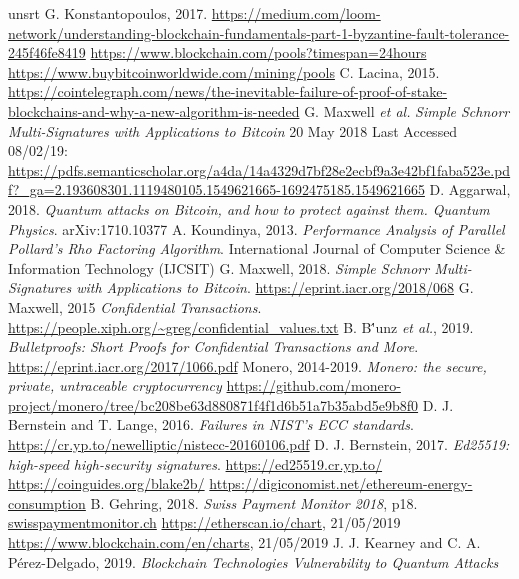 \documentclass[a4paper, 12pt]{book}
\begin{document}
\begin{thebibliography} {unsrt}
 G. Konstantopoulos, 2017. \url{https://medium.com/loom-network/understanding-blockchain-fundamentals-part-1-byzantine-fault-tolerance-245f46fe8419}
 \url{https://www.blockchain.com/pools?timespan=24hours} 
 \url{https://www.buybitcoinworldwide.com/mining/pools}
 C. Lacina, 2015. \url{https://cointelegraph.com/news/the-inevitable-failure-of-proof-of-stake-blockchains-and-why-a-new-algorithm-is-needed}
 G. Maxwell \textit{et al.} {\em Simple Schnorr Multi-Signatures with Applications to Bitcoin} 20 May 2018 Last Accessed 08/02/19: \url{https://pdfs.semanticscholar.org/a4da/14a4329d7bf28e2ecbf9a3e42bf1faba523e.pdf?_ga=2.193608301.1119480105.1549621665-1692475185.1549621665} 
 D. Aggarwal, 2018. {\em Quantum attacks on Bitcoin, and how to protect against them. Quantum Physics}. arXiv:1710.10377
 A. Koundinya, 2013. {\em Performance Analysis of Parallel Pollard's Rho Factoring Algorithm}. International Journal of Computer Science \& Information Technology (IJCSIT)
 G. Maxwell, 2018. {\em Simple Schnorr Multi-Signatures with Applications to Bitcoin}. \url{https://eprint.iacr.org/2018/068}
 G. Maxwell, 2015 {\em Confidential Transactions}. \url{https://people.xiph.org/~greg/confidential_values.txt}
 B. B\''{u}nz \textit{et al.}, 2019. {\em Bulletproofs:  Short Proofs for Confidential Transactions and More}.  \url{https://eprint.iacr.org/2017/1066.pdf}
 Monero, 2014-2019. {\em Monero: the secure, private, untraceable cryptocurrency}  \url{https://github.com/monero-project/monero/tree/bc208be63d880871f4f1d6b51a7b35abd5e9b8f0}
 D. J. Bernstein and T. Lange, 2016.  {\em Failures in NIST's ECC standards}. \url{https://cr.yp.to/newelliptic/nistecc-20160106.pdf}
 D. J. Bernstein, 2017. {\em Ed25519: high-speed high-security signatures}. \url{https://ed25519.cr.yp.to/}
 \url{https://coinguides.org/blake2b/}
 \url{https://digiconomist.net/ethereum-energy-consumption}
 B. Gehring, 2018. {\em Swiss Payment Monitor 2018}, p18. \url{swisspaymentmonitor.ch}
 \url{https://etherscan.io/chart}, 21/05/2019
 \url{https://www.blockchain.com/en/charts}, 21/05/2019
 J. J. Kearney and C. A. P\'erez-Delgado, 2019. {\em Blockchain Technologies Vulnerability to Quantum Attacks}

\end{thebibliography}
\end{document}
